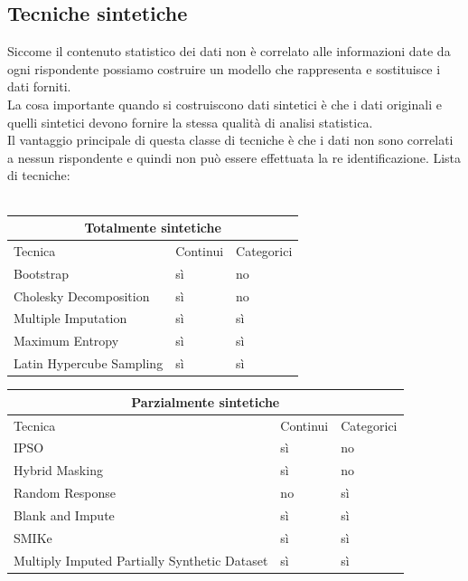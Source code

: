 \subsection{Tecniche sintetiche}
Siccome il contenuto statistico dei dati non è correlato alle informazioni date da ogni rispondente possiamo costruire un modello che rappresenta e sostituisce i dati forniti. \\
La cosa importante quando si costruiscono dati sintetici è che i dati originali e quelli sintetici devono fornire la stessa qualità di analisi statistica.\\
Il vantaggio principale di questa classe di tecniche è che i dati non sono correlati a nessun rispondente e quindi non può essere effettuata la re identificazione.
Lista di tecniche:\\\\

\begin{tabular}{ |p{3cm}||p{3cm}|p{3cm}|  }
 \hline
 \multicolumn{3}{|c|}{Totalmente sintetiche} \\
 \hline
Tecnica & Continui & Categorici \\
 \hline
Bootstrap & sì & no  \\
Cholesky Decomposition & sì & no  \\
Multiple Imputation & sì & sì  \\
Maximum Entropy & sì & sì  \\
Latin Hypercube Sampling & sì & sì  \\
 \hline
\end{tabular}

\begin{tabular}{ |p{3cm}||p{3cm}|p{3cm}|  }
 \hline
 \multicolumn{3}{|c|}{Parzialmente sintetiche} \\
 \hline
Tecnica & Continui & Categorici \\
 \hline
IPSO & sì & no  \\
Hybrid Masking & sì & no  \\
Random Response & no & sì \\
Blank and Impute & sì & sì  \\
SMIKe & sì & sì  \\
Multiply Imputed Partially Synthetic Dataset & sì & sì  \\
 \hline
\end{tabular}